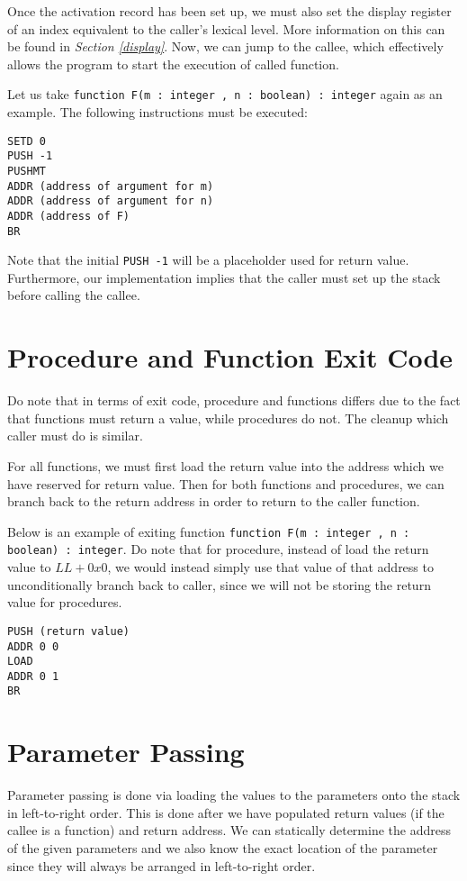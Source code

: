 \documentclass{article}
\begin{document}
Once the activation record has been set up, we must also set the display register of an index equivalent to the caller's lexical level. More information on this can be found in {\it Section \ref{display}}. Now, we can jump to the callee, which effectively allows the program to start the execution of called function.

Let us take {\tt function F(m : integer , n : boolean) : integer} again as an example. The following instructions must be executed:

\begin{lstlisting}
SETD 0
PUSH -1
PUSHMT
ADDR (address of argument for m)
ADDR (address of argument for n)
ADDR (address of F)
BR
\end{lstlisting}

Note that the initial {\tt PUSH -1} will be a placeholder used for return value. Furthermore, our implementation implies that the caller must set up the stack before calling the callee.

\section{Procedure and Function Exit Code} \label{exit}

Do note that in terms of exit code, procedure and functions differs due to the fact that functions must return a value, while procedures do not. The cleanup which caller must do is similar.

For all functions, we must first load the return value into the address which we have reserved for return value. Then for both functions and procedures, we can branch back to the return address in order to return to the caller function.

Below is an example of exiting function {\tt function F(m : integer , n : boolean) : integer}. Do note that for procedure, instead of load the return value to $LL + 0x0$, we would instead simply use that value of that address to unconditionally branch back to caller, since we will not be storing the return value for procedures.

\begin{lstlisting}
PUSH (return value)
ADDR 0 0
LOAD
ADDR 0 1
BR
\end{lstlisting}

\section{Parameter Passing}

Parameter passing is done via loading the values to the parameters onto the stack in left-to-right order. This is done after we have populated return values (if the callee is a function) and return address. We can statically determine the address of the given parameters and we also know the exact location of the parameter since they will always be arranged in left-to-right order.
\end{document}
